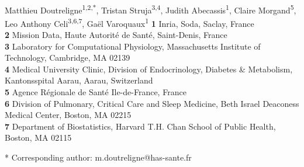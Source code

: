\documentclass[10pt,letterpaper]{article}
\begin{document}
\vspace*{0.2in}

\begin{flushleft}
  {\Large
    \textbf{} %
  }
  \newline
  \\
  Matthieu Doutreligne\textsuperscript{1,2,*},
  Tristan Struja\textsuperscript{3,4},
  Judith Abecassis\textsuperscript{1},
  Claire Morgand\textsuperscript{5},
  Leo Anthony Celi\textsuperscript{3,6,7},
  Gaël Varoquaux\textsuperscript{1}
  \bigskip
  \textbf{1} Inria, Soda, Saclay, France
  \\
  \textbf{2} Mission Data, Haute Autorité de Santé, Saint-Denis, France
  \\
  \textbf{3} Laboratory for Computational Physiology, Massachusetts Institute of Technology, Cambridge, MA 02139
  \\
  \textbf{4} Medical University Clinic, Division of Endocrinology, Diabetes \& Metabolism, Kantonsspital Aarau, Aarau, Switzerland
  \\
  \textbf{5} Agence Régionale de Santé Ile-de-France, France
  \\
  \textbf{6} Division of Pulmonary, Critical Care and Sleep Medicine, Beth Israel Deaconess Medical Center, Boston, MA 02215
  \\
  \textbf{7} Department of Biostatistics, Harvard T.H. Chan School of Public Health, Boston, MA 02115
  \bigskip









  * Corresponding author: m.doutreligne@has-sante.fr


\end{flushleft}
\end{document}
